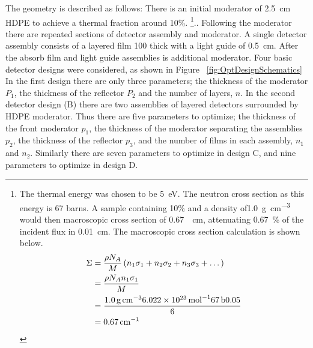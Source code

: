 The geometry is described as follows:
There is an initial moderator of \SI{2.5}{\centi \meter} HDPE to achieve a thermal fraction around 10\%.
\footnote{The thermal energy was chosen to be \SI{5}{\electronvolt}. 
The  neutron cross section as this energy is 67 barns. 
A sample containing 10\%  and a density of\SI{1.0}{\gram \per \cubic \centi\meter} would then macroscopic cross section of \SI{0.67}{\per \centi\meter}, attenuating \SI{0.67}{\percent} of the incident flux in \SI{0.01}{ \centi\meter}. 
The macroscopic cross section calculation is shown below. 
\begin{align*}
\Sigma &= \frac{\rho N_A}{M}  \left ( n_1 \sigma_1 + n_2 \sigma_2 + n_3 \sigma_3 + \dots  \right ) \\ 
       &= \frac{\rho N_A n_1 \sigma_1}{M} \\
       &= \frac{\SI{1.0}{\gram\per\cubic\centi\meter} \SI{6.022E23}{\per\mole} \SI{67}{\barn}{0.05}}{6} \\
       &= \SI{0.67}{\per\centi\meter} 
\end{align*}
}..
Following the moderator there are repeated sections of detector assembly and moderator.
A single detector assembly consists of a layered film \SI{100}{\micron} thick with a light guide of \SI{0.5}{\centi\meter}.
After the absorb film and light guide assemblies is additional moderator.
Four basic detector designs were considered, as shown in Figure ~\ref{fig:OptDesignSchematics}
In the first design there are only three parameters; the thickness of the moderator $P_1$, the thickness of the reflector $P_2$ and the number of layers, $n$. 
In the second detector design (B) there are two assemblies of layered detectors surrounded by HDPE moderator.  Thus there are five parameters to optimize; the thickness of the front moderator $p_1$, the thickness of the moderator separating the assemblies $p_2$, the thickness of the reflector $p_3$, and the number of films in each assembly, $n_1$ and $n_2$.
Similarly there are seven parameters to optimize in design C, and nine parameters to optimize in design D.

